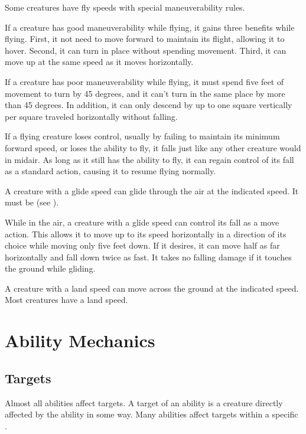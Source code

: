         \label{Maneuverability} Some creatures have fly speeds with special maneuverability rules.

         If a creature has good maneuverability while flying, it gains three benefits while flying.
        First, it not need to move forward to maintain its flight, allowing it to hover.
        Second, it can turn in place without spending movement.
        Third, it can move up at the same speed as it moves horizontally.

         If a creature has poor maneuverability while flying, it must spend five feet of movement to turn by 45 degrees, and it can't turn in the same place by more than 45 degrees. In addition, it can only descend by up to one square vertically per square traveled horizontally without falling.

         If a flying creature loses control, usually by failing to maintain its minimum forward speed, or loses the ability to fly, it falls just like any other creature would in midair. As long as it still has the ability to fly, it can regain control of its fall as a standard action, causing it to resume flying normally.

        \label{Gliding}
        A creature with a glide speed can glide through the air at the indicated speed. It must be  (see ).

        While in the air, a creature with a glide speed can control its fall as a move action. This allows it to move up to its speed horizontally in a direction of its choice while moving only five feet down. If it desires, it can move half as far horizontally and fall down twice as fast. It takes no falling damage if it touches the ground while gliding.

        A creature with a land speed can move across the ground at the indicated speed.
        Most creatures have a land speed.

\section{Ability Mechanics}\label{Ability Mechanics}

    \subsection{Targets}\label{Targets}
        Almost all abilities affect targets.
        A target of an ability is a creature directly affected by the ability in some way.
        Many abilities affect targets within a specific .

